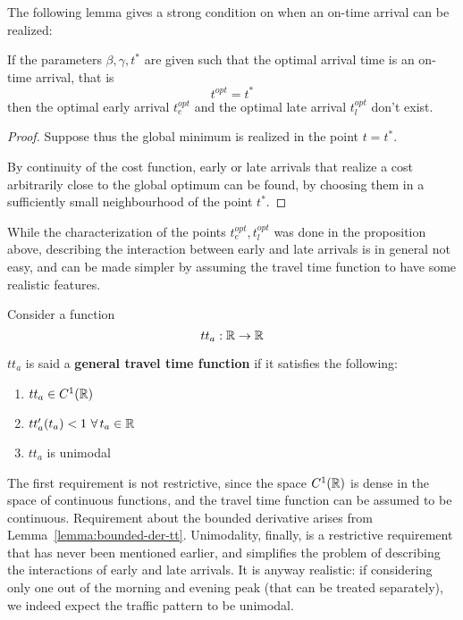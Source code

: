 The following lemma gives a strong condition on when an on-time arrival can be realized:
\begin{lemma}
  \label{lemma:where-no-ot}
  If the parameters \(\beta, \gamma, t^*\) are given such that the optimal arrival time is an on-time arrival, that is
  \begin{equation*}
    t^{opt} = t^*
  \end{equation*}
  then the optimal early arrival \(t_e^{opt}\) and the optimal late arrival \(t_l^{opt}\) don't exist.
\end{lemma}
\begin{proof}
  Suppose thus the global minimum is realized in the point \(t = t^*\).
  
  By continuity of the cost function,
  early or late arrivals that realize a cost arbitrarily close to the global optimum can be found,
  by choosing them in a sufficiently small neighbourhood of the point \(t^*\).
\end{proof}

While the characterization of the points \(t_e^{opt}, t_l^{opt}\) was done in the proposition above,
describing the interaction between early and late arrivals is in general not easy,
and can be made simpler by assuming the travel time function to have some realistic features.

\begin{definition}
  \label{def:gen-tt-fun}
  Consider a function
  \begin{equation*}
    tt_a: \mathbb{R} \rightarrow \mathbb{R}
  \end{equation*}

  \(tt_a\) is said a \textbf{general travel time function} if it satisfies the following:
  \begin{enumerate}
  \item \(tt_a \in C^1(\mathbb{R})\)
  \item \(tt_a'(t_a) < 1\ \forall\, t_a\in \mathbb{R}\)
  \item \(tt_a\) is unimodal
  \end{enumerate}
\end{definition}

The first requirement is not restrictive,
since the space \(C^1(\mathbb{R})\) is dense in the space of continuous functions,
and the travel time function can be assumed to be continuous.
Requirement about the bounded derivative arises from Lemma~\ref{lemma:bounded-der-tt}.
Unimodality, finally, is a restrictive requirement that has never been mentioned earlier,
and simplifies the problem of describing the interactions of early and late arrivals.
It is anyway realistic:
if considering only one out of the morning and evening peak (that can be treated separately),
we indeed expect the traffic pattern to be unimodal.

